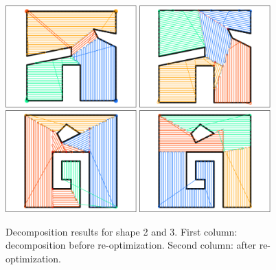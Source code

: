 \documentclass[../main.tex]{subfiles}
\begin{document}
\begin{figure}
	\centering
	\includegraphics[width=0.45\textwidth]{img/chapter_5/ID_2_orig.pdf}%
	\includegraphics[width=0.45\textwidth]{img/chapter_5/ID_2_reopt_BETTER.pdf}
	\includegraphics[width=0.45\textwidth]{img/chapter_5/ID_3_orig_BETTER.pdf}%
	\includegraphics[width=0.45\textwidth]{img/chapter_5/ID_3_reopt_BETTER.pdf}
	\caption{Decomposition results for shape 2 and 3. First column: decomposition before re-optimization. Second column: after re-optimization.}
	\label{fig:decomposition_results}
\end{figure}
\end{document}
